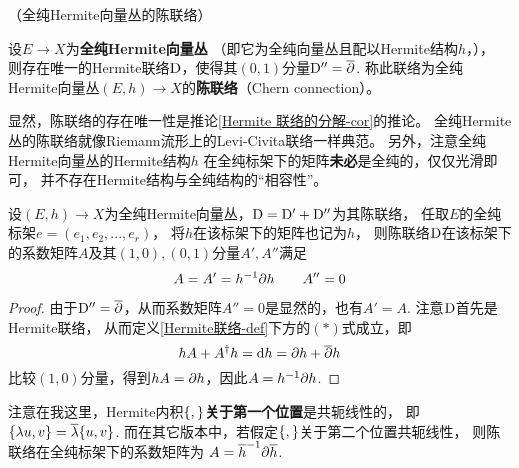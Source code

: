
\begin{definition}（全纯Hermite向量丛的陈联络）

设$E\to X$为\textbf{全纯Hermite向量丛}
（即它为全纯向量丛且配以Hermite结构$h$，），
则存在唯一的Hermite联络$\mathrm{D}$，使得其$(0,1)$分量$\mathrm{D}''=\overline{\partial}$.
称此联络为全纯Hermite向量丛$(E,h)\to X$的\textbf{陈联络}（Chern connection）。
\end{definition}

显然，陈联络的存在唯一性是推论\ref{Hermite 联络的分解-cor}的推论。
全纯Hermite丛的陈联络就像Riemann流形上的Levi-Civita联络一样典范。
另外，注意全纯Hermite向量丛的Hermite结构$h$
在全纯标架下的矩阵\textbf{未必}是全纯的，仅仅光滑即可，
并不存在Hermite结构与全纯结构的“相容性”。


\begin{lemma}
设$(E,h)\to X$为全纯Hermite向量丛，$\mathrm{D}=\mathrm{D}'+\mathrm{D}''$为其陈联络，
任取$E$的全纯标架$e=(e_1,e_2,...,e_r)$，
将$h$在该标架下的矩阵也记为$h$，
则陈联络$\mathrm{D}$在该标架下的系数矩阵$A$及其$(1,0),(0,1)$分量$A',A''$满足
$$
  A=A'=h^{-1}\partial h
\qquad
  A''=0
$$
\end{lemma}

\begin{proof}
由于$\mathrm{D}''=\overline{\partial}$，从而系数矩阵$A''=0$是显然的，也有$A'=A$.
注意$\mathrm{D}$首先是Hermite联络，
从而定义\ref{Hermite联络-def}下方的$(*)$式成立，即
$$
  hA+A^\dag h=\mathrm{d} h=\partial h+\overline{\partial} h
$$
比较$(1,0)$分量，得到$hA=\partial h$，因此$A=h^{-1}\partial h$.
\end{proof}

{\color{blue}
注意在我这里，Hermite内积$\{ , \}$\textbf{关于第一个位置}是共轭线性的，
即$\{ \lambda u,v \}=\overline{\lambda}\{ u,v \}$.
而在其它版本中，若假定$\{ , \}$关于第二个位置共轭线性，
则陈联络在全纯标架下的系数矩阵为
$A=\overline{h}^{-1}\partial\overline{h}$.
}

